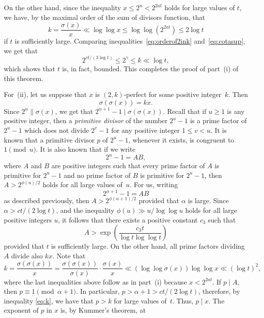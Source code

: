 \documentclass[twoside,amsthm]{elsart}
\begin{document}
On the other hand, since the inequality $x \le 2^n<2^{2at}$ holds
for large values of $t$, we have, by the maximal order of the sum of
divisors function, that
\begin{equation}
\label{eq:cotasup} 
k = \frac{\sigma(x)}{x}\ll \log\log x \le
\log\log(2^{2at}) \le 2\log t
\end{equation}
if $t$ is sufficiently large. Comparing
inequalities~\eqref{eq:orderof2ink} and~\eqref{eq:cotasup}, we get that
$$
2^{ct/(3\log t)} \le 2^{\gamma}\le k\ll \log t,
$$
which shows that $t$ is, in fact, bounded. This completes the proof
of part~(i) of this theorem.

For~(ii), let us suppose that $x$ is $(2,k)$-perfect for some
positive integer~$k$. Then
$$
\sigma(\sigma(x))=kx.
$$
Since $2^{\alpha} \parallel \sigma(x)$, we get that $2^{\alpha+1}-1\mid
\sigma(\sigma(x))$. Recall that if $u\ge 1$ is any positive integer,
then a {\it primitive divisor} of the number $2^u-1$ is a prime
factor of $2^u-1$ which does not divide $2^v-1$ for any positive
integer $1\le v<u$. It is known that a primitive divisor $p$ of
$2^u-1$, whenever it exists, is congruent to $1\pmod u$. It is also
known that if we write
$$
2^u-1=AB,
$$
where $A$ and $B$ are positive integers such that every prime factor
of $A$ is primitive for $2^u-1$ and no prime factor of $B$ is
primitive for $2^u-1$, then  $A>2^{\phi(u)/2}$ holds for all large
values of~$u$. For us, writing
$$
2^{\alpha+1}-1=AB
$$
as described previously, then $A>2^{\phi(\alpha+1)/2}$ provided that
$\alpha$ is large. Since $\alpha>ct/(2\log t)$, and the inequality
$\phi(u)\gg u/\log\log u$ holds for all large positive integers $u$,
it follows that there exists a positive constant $c_3$ such that
\begin{equation}
\label{eq:lowA}
A > \exp\left(\frac{c_3 t}{\log t\log\log t}\right)
\end{equation}
provided that $t$ is sufficiently large. On the other hand, all
prime factors dividing $A$ divide also $kx$. Note that
\begin{equation}
\label{eq:k}
k = \frac{\sigma(\sigma(x))}{x} 
= \frac{\sigma(\sigma(x))}{\sigma(x)} \cdot
\frac{\sigma(x)}{x} \ll (\log\log \sigma(x))\log\log x \ll (\log t)^2,
\end{equation}
where the last inequalities above follow as in part~(i) because
$x<2^{2at}$. If $p\mid A$, then $p\equiv 1\pmod{\alpha+1}$. In
particular, $p>\alpha+1>ct/(2\log t)$, therefore, by inequality
\eqref{eq:k}, we have that $p>k$ for large values of~$t$. Thus,
$p\mid x$. The exponent of $p$ in $x$ is, by Kummer's theorem, at
\end{document}
